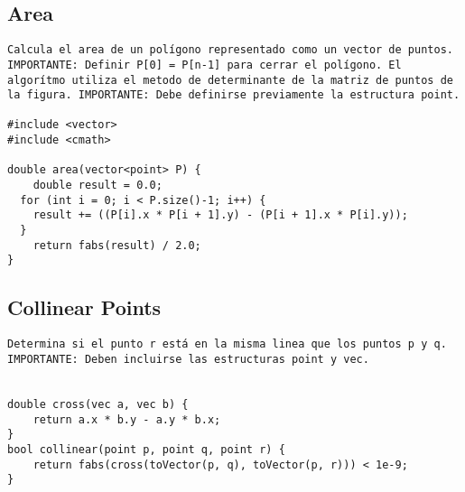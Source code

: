 \documentclass[10pt,letterpaper,twocolumn,twosided]{article}
\begin{document}
\subsection{Area}
\begin{lstlisting}
Calcula el area de un polígono representado como un vector de puntos. IMPORTANTE: Definir P[0] = P[n-1] para cerrar el polígono. El algorítmo utiliza el metodo de determinante de la matriz de puntos de la figura. IMPORTANTE: Debe definirse previamente la estructura point.

#include <vector>
#include <cmath>

double area(vector<point> P) {
	double result = 0.0;
  for (int i = 0; i < P.size()-1; i++) {
  	result += ((P[i].x * P[i + 1].y) - (P[i + 1].x * P[i].y));
  }
	return fabs(result) / 2.0; 
}
\end{lstlisting}

\subsection{Collinear Points}
\begin{lstlisting}
Determina si el punto r está en la misma linea que los puntos p y q. IMPORTANTE: Deben incluirse las estructuras point y vec.


double cross(vec a, vec b) { 
	return a.x * b.y - a.y * b.x; 
}
bool collinear(point p, point q, point r) {
	return fabs(cross(toVector(p, q), toVector(p, r))) < 1e-9; 
}
\end{lstlisting}
\end{document}

